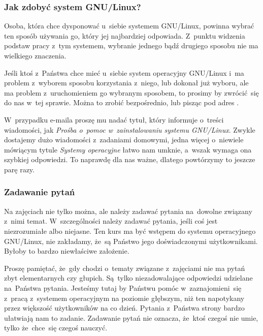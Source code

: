 \documentclass[10pt,t]{beamer}
\begin{document}
\begin{frame}
  \frametitle{Jak zdobyć system GNU/Linux?}


  Osoba, która chce dysponować u~siebie systemem GNU/Linux, powinna wybrać
  ten sposób używania go, który jej najbardziej odpowiada. Z~punktu widzenia
  podstaw pracy z~tym systemem, wybranie jednego bądź drugiego sposobu nie
  ma wielkiego znaczenia.

  Jeśli ktoś z~Państwa chce mieć u~siebie system operacyjny GNU/Linux i~ma
  problem z~wyborem sposobu korzystania z~niego, lub dokonał już wyboru,
  ale ma problem z~uruchomieniem go wybranym sposobem, to prosimy by
  zwrócić~się do nas w~tej sprawie. Można to zrobić bezpośrednio, lub
  pisząc pod adres \email.

  W~przypadku e-maila proszę mu nadać tytuł, który informuje o~treści
  wiadomości, jak \textit{Prośba o~pomoc w~zainstalowaniu systemu
    GNU/Linux}. Zwykle
  dostajemy dużo wiadomości z~zadaniami domowymi, jedna więcej o~niewiele
  mówiącym tytule \textit{Systemy operacyjne} łatwo nam umknie, a~wszak
  wymaga ona szybkiej odpowiedzi. To naprawdę dla nas ważne, dlatego
  powtórzymy to jeszcze parę razy.

\end{frame}





\begin{frame}
  \frametitle{Zadawanie pytań}


  Na zajęciach nie tylko można, ale \alert{należy} zadawać pytania
  na~dowolne związany z~nimi temat. W~szczególności \alert{należy} zadawać
  pytania, jeśli coś jest niezrozumiałe albo niejasne. Ten kurs ma być
  wstępem do systemu operacyjnego GNU/Linux, \alert{nie} zakładamy, że~są
  Państwo jego doświadczonymi użytkownikami. Byłoby to bardzo
  niewłaściwe założenie.

  Proszę pamiętać, że~gdy chodzi o~tematy związane z~zajęciami \alert{nie}
  ma pytań zbyt elementarnych czy głupich. Są~tylko niezadowalające
  odpowiedzi udzielane na~Państwa pytania. Jesteśmy tutaj by Państwu pomóc
  w~zaznajomieni~się z~pracą z~systemem operacyjnym na poziomie głębszym,
  niż ten napotykany przez większość użytkowników na co dzień.
  Pytania z~Państwa strony bardzo ułatwiają nam to zadanie. Zadawanie pytań
  nie oznacza, że~ktoś czegoś nie umie, tylko że~chce~się czegoś nauczyć.

\end{frame}
\end{document}
